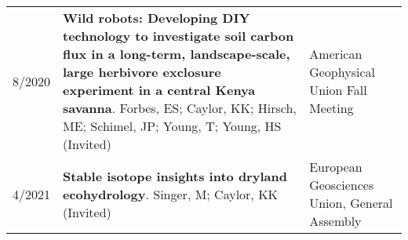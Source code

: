 \begin{longtable}{lp{10.0cm}p{4.5cm}}
8/2020 & {\bf Wild robots: Developing DIY technology to investigate soil carbon flux in a long-term, landscape-scale, large herbivore exclosure experiment in a central Kenya savanna}. Forbes, ES; Caylor, KK; Hirsch, ME; Schimel, JP; Young, T; Young, HS  (Invited)  & American Geophysical Union Fall Meeting \\
  
4/2021 & {\bf Stable isotope insights into dryland ecohydrology}. Singer, M; Caylor, KK  (Invited)  & European Geosciences Union, General Assembly 
 \\
 \end{longtable}

